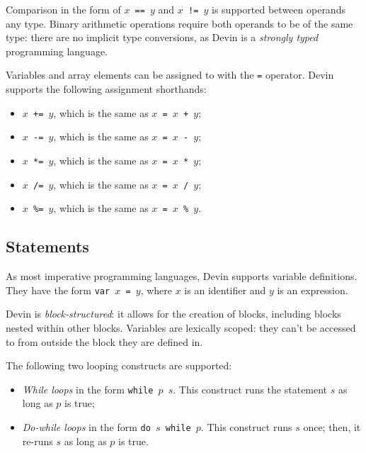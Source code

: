 \documentclass[11pt, american, draft]{PhdThesis}
\begin{document}
  Comparison in the form of \mbox{\texttt{$x$ == $y$}} and \mbox{\texttt{$x$ != $y$}} is supported
  between operands any type. Binary arithmetic operations require both operands to be of the same
  type: there are no implicit type conversions, as Devin is a \emph{strongly typed} programming
  language.

  Variables and array elements can be assigned to with the \verb$=$ operator. Devin supports the
  following assignment shorthands:

  \begin{itemize}[noitemsep,topsep=0pt]
    \item \mbox{\texttt{$x$ += $y$}}, which is the same as \mbox{\texttt{$x$ = $x$ + $y$}};
    \item \mbox{\texttt{$x$ -= $y$}}, which is the same as \mbox{\texttt{$x$ = $x$ - $y$}};
    \item \mbox{\texttt{$x$ *= $y$}}, which is the same as \mbox{\texttt{$x$ = $x$ * $y$}};
    \item \mbox{\texttt{$x$ /= $y$}}, which is the same as \mbox{\texttt{$x$ = $x$ / $y$}};
    \item \mbox{\texttt{$x$ \%= $y$}}, which is the same as \mbox{\texttt{$x$ = $x$ \% $y$}}.
  \end{itemize}

  \subsection{Statements}

  As most imperative programming languages, Devin supports variable definitions. They have the form
  \mbox{\texttt{var $x$ = $y$}}, where $x$ is an identifier and $y$ is an expression.

  Devin is \emph{block-structured}: it allows for the creation of blocks, including blocks nested
  within other blocks. Variables are lexically scoped: they can't be accessed to from outside the
  block they are defined in.

  The following two looping constructs are supported:

  \begin{itemize}[noitemsep,topsep=0pt]
    \item \emph{While loops} in the form \mbox{\texttt{while $p$ $s$}}. This construct runs the
          statement $s$ as long as $p$ is true;

    \item \emph{Do-while loops} in the form \mbox{\texttt{do $s$ while $p$}}. This construct runs
          $s$ once; then, it re-runs $s$ as long as $p$ is true.
  \end{itemize}
\end{document}
